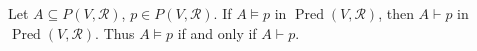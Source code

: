 Let $A \subseteq P(V, \mathcal{R})$, $p \in P(V, \mathcal{R})$. If $A \models p$ in $\operatorname{Pred}(V, \mathcal{R})$, then $A \vdash p$ in $\operatorname{Pred}(V, \mathcal{R})$. Thus $A \models p$ if and only if $A \vdash p$.
